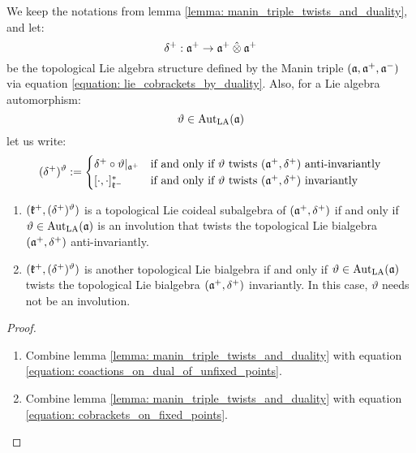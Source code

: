         \begin{theorem} \label{theorem: twisted_lie_bialgebraic_structures}
            We keep the notations from lemma \ref{lemma: manin_triple_twists_and_duality}, and let:
                $$\delta^+: \a^+ \to \a^+ \hattensor \a^+$$
            be the topological Lie algebra structure defined by the Manin triple $(\mathfrak{a}, \mathfrak{a}^+, \mathfrak{a}^-)$ via equation \eqref{equation: lie_cobrackets_by_duality}. Also, for a Lie algebra automorphism:
                $$\vartheta \in \operatorname{Aut}_{\mathrm{LA}}(\mathfrak{a})$$
            let us write:
                \begin{equation} \label{equation: twisted_lie_cobrackets}
                    (\delta^+)^{\vartheta} :=
                    \begin{cases}
                        \delta^+ \circ \vartheta|_{\mathfrak{a}^+} & \text{if and only if $\vartheta$ twists $(\mathfrak{a}^+, \delta^+)$ anti-invariantly}
                        \\
                        [\cdot, \cdot]_{\mathfrak{k}^-}^* & \text{if and only if $\vartheta$ twists $(\mathfrak{a}^+, \delta^+)$ invariantly}
                    \end{cases}
                \end{equation}
            \begin{enumerate}
                \item $(\mathfrak{k}^+, (\delta^+)^{\vartheta})$ is a topological Lie coideal subalgebra of $(\mathfrak{a}^+, \delta^+)$ if and only if $\vartheta \in \operatorname{Aut}_{\mathrm{LA}}(\mathfrak{a})$ is an involution that twists the topological Lie bialgebra $(\mathfrak{a}^+, \delta^+)$ anti-invariantly.
                \item $(\mathfrak{k}^+, (\delta^+)^{\vartheta})$ is another topological Lie bialgebra if and only if $\vartheta \in \operatorname{Aut}_{\mathrm{LA}}(\mathfrak{a})$ twists the topological Lie bialgebra $(\mathfrak{a}^+, \delta^+)$ invariantly. In this case, $\vartheta$ needs not be an involution.
            \end{enumerate}
        \end{theorem}
            \begin{proof}
                \begin{enumerate}
                    \item Combine lemma \ref{lemma: manin_triple_twists_and_duality} with equation \eqref{equation: coactions_on_dual_of_unfixed_points}.
                    \item Combine lemma \ref{lemma: manin_triple_twists_and_duality} with equation \eqref{equation: cobrackets_on_fixed_points}.
                \end{enumerate}
            \end{proof}
            
